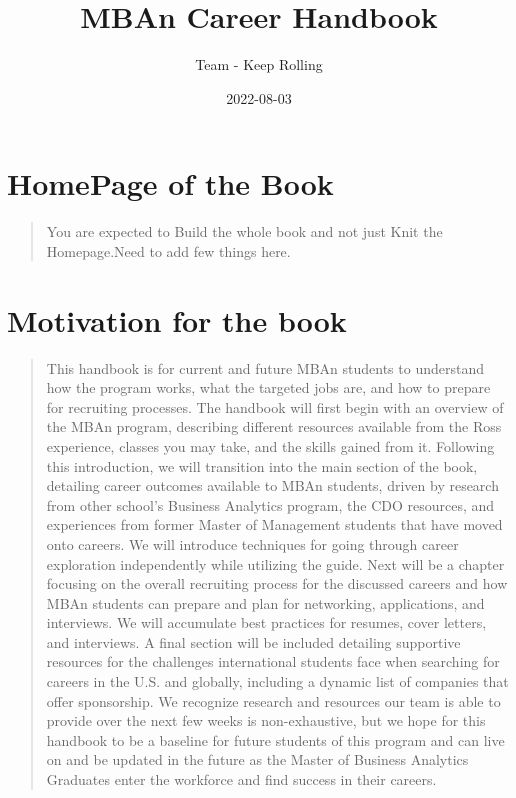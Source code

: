 \documentclass[
]{book}
\title{MBAn Career Handbook}
\author{Team - Keep Rolling}
\date{2022-08-03}
\begin{document}
\maketitle

{
\setcounter{tocdepth}{1}
\tableofcontents
}
\hypertarget{homepage-of-the-book}{%
\chapter*{HomePage of the Book}\label{homepage-of-the-book}}

\begin{quote}
You are expected to Build the whole book and not just Knit the Homepage.Need to add few things here.
\end{quote}

\hypertarget{motivation-for-the-book}{%
\chapter*{Motivation for the book}\label{motivation-for-the-book}}

\begin{quote}
This handbook is for current and future MBAn students to understand how the program works, what the targeted jobs are, and how to prepare for recruiting processes. The handbook will first begin with an overview of the MBAn program, describing different resources available from the Ross experience, classes you may take, and the skills gained from it. Following this introduction, we will transition into the main section of the book, detailing career outcomes available to MBAn students, driven by research from other school's Business Analytics program, the CDO resources, and experiences from former Master of Management students that have moved onto careers. We will introduce techniques for going through career exploration independently while utilizing the guide. Next will be a chapter focusing on the overall recruiting process for the discussed careers and how MBAn students can prepare and plan for networking, applications, and interviews. We will accumulate best practices for resumes, cover letters, and interviews. A final section will be included detailing supportive resources for the challenges international students face when searching for careers in the U.S. and globally, including a dynamic list of companies that offer sponsorship. We recognize research and resources our team is able to provide over the next few weeks is non-exhaustive, but we hope for this handbook to be a baseline for future students of this program and can live on and be updated in the future as the Master of Business Analytics Graduates enter the workforce and find success in their careers.
\end{quote}
\end{document}
